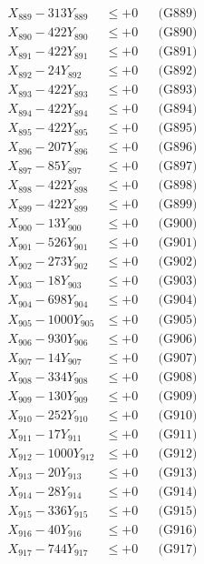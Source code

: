 \documentclass[a4paper,10pt]{article}
\begin{document}
{\begin{align}
X_{889} - 313Y_{889} &\leq +0 && \text{(G889)} \\
X_{890} - 422Y_{890} &\leq +0 && \text{(G890)} \\
\allowbreak
X_{891} - 422Y_{891} &\leq +0 && \text{(G891)} \\
X_{892} - 24Y_{892} &\leq +0 && \text{(G892)} \\
X_{893} - 422Y_{893} &\leq +0 && \text{(G893)} \\
X_{894} - 422Y_{894} &\leq +0 && \text{(G894)} \\
X_{895} - 422Y_{895} &\leq +0 && \text{(G895)} \\
X_{896} - 207Y_{896} &\leq +0 && \text{(G896)} \\
X_{897} - 85Y_{897} &\leq +0 && \text{(G897)} \\
X_{898} - 422Y_{898} &\leq +0 && \text{(G898)} \\
X_{899} - 422Y_{899} &\leq +0 && \text{(G899)} \\
X_{900} - 13Y_{900} &\leq +0 && \text{(G900)} \\
\allowbreak
X_{901} - 526Y_{901} &\leq +0 && \text{(G901)} \\
X_{902} - 273Y_{902} &\leq +0 && \text{(G902)} \\
X_{903} - 18Y_{903} &\leq +0 && \text{(G903)} \\
X_{904} - 698Y_{904} &\leq +0 && \text{(G904)} \\
X_{905} - 1000Y_{905} &\leq +0 && \text{(G905)} \\
X_{906} - 930Y_{906} &\leq +0 && \text{(G906)} \\
X_{907} - 14Y_{907} &\leq +0 && \text{(G907)} \\
X_{908} - 334Y_{908} &\leq +0 && \text{(G908)} \\
X_{909} - 130Y_{909} &\leq +0 && \text{(G909)} \\
X_{910} - 252Y_{910} &\leq +0 && \text{(G910)} \\
\allowbreak
X_{911} - 17Y_{911} &\leq +0 && \text{(G911)} \\
X_{912} - 1000Y_{912} &\leq +0 && \text{(G912)} \\
X_{913} - 20Y_{913} &\leq +0 && \text{(G913)} \\
X_{914} - 28Y_{914} &\leq +0 && \text{(G914)} \\
X_{915} - 336Y_{915} &\leq +0 && \text{(G915)} \\
X_{916} - 40Y_{916} &\leq +0 && \text{(G916)} \\
X_{917} - 744Y_{917} &\leq +0 && \text{(G917)} \\

\end{align}}
\end{document}
